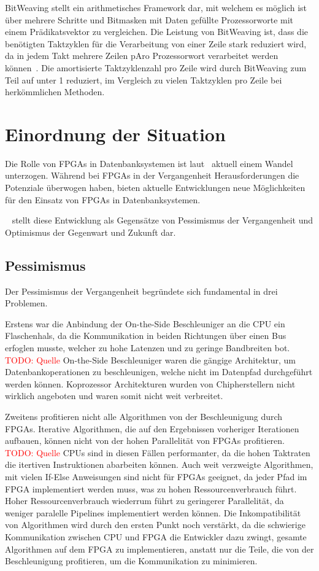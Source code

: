 \documentclass[conference]{IEEEtran}
\newcommand{\todo}[1]{\textcolor{red}{TODO: #1}}
\begin{document}
BitWeaving stellt ein arithmetisches Framework dar, mit welchem es möglich ist über mehrere Schritte und Bitmasken mit Daten gefüllte Prozessorworte mit einem Prädikatsvektor zu vergleichen.
Die Leistung von BitWeaving ist, dass die benötigten Taktzyklen für die Verarbeitung von einer Zeile stark reduziert wird, da in jedem Takt mehrere Zeilen pAro Prozessorwort verarbeitet werden können~\cite{li_bitweaving_2013}.
Die amortisierte Taktzyklenzahl pro Zeile wird durch BitWeaving zum Teil auf unter 1 reduziert, im Vergleich zu vielen Taktzyklen pro Zeile bei herkömmlichen Methoden.



\section{Einordnung der Situation}
Die Rolle von FPGAs in Datenbanksystemen ist laut~\cite{istvan_glass_2019} aktuell einem Wandel unterzogen. Während bei FPGAs in der Vergangenheit
Herausforderungen die Potenziale überwogen haben, bieten aktuelle Entwicklungen neue Möglichkeiten für den Einsatz von FPGAs in Datenbanksystemen.

~\cite{istvan_glass_2019} stellt diese Entwicklung als Gegensätze von Pessimismus der Vergangenheit und Optimismus der Gegenwart und Zukunft dar.

\subsection{Pessimismus}
Der Pessimismus der Vergangenheit begründete sich fundamental in drei Problemen.

Erstens war die Anbindung der On-the-Side Beschleuniger an die CPU ein Flaschenhals, da die Kommunikation in beiden Richtungen über
einen Bus erfoglen musste, welcher zu hohe Latenzen und zu geringe Bandbreiten bot. \todo{Quelle} On-the-Side Beschleuniger waren
die gängige Architektur, um Datenbankoperationen zu beschleunigen, welche nicht im Datenpfad durchgeführt werden können.
Koprozessor Architekturen wurden von Chipherstellern nicht wirklich angeboten und waren somit nicht weit verbreitet.

Zweitens profitieren nicht alle Algorithmen von der Beschleunigung durch FPGAs. Iterative Algorithmen, die auf den Ergebnissen vorheriger
Iterationen aufbauen, können nicht von der hohen Parallelität von FPGAs profitieren. \todo{Quelle} CPUs sind in diesen Fällen performanter,
da die hohen Taktraten die itertiven Instruktionen abarbeiten können. Auch weit verzweigte Algorithmen, mit vielen If-Else Anweisungen
sind nicht für FPGAs geeignet, da jeder Pfad im FPGA implementiert werden muss, was zu hohen Ressourcenverbrauch führt. Hoher Ressourcenverbrauch
wiederrum führt zu geringerer Parallelität, da weniger paralelle Pipelines implementiert werden können. Die Inkompatibilität von Algorithmen
wird durch den ersten Punkt noch verstärkt, da die schwierige Kommunikation zwischen CPU und FPGA die Entwickler dazu zwingt, gesamte Algorithmen
auf dem FPGA zu implementieren, anstatt nur die Teile, die von der Beschleunigung profitieren, um die Kommunikation zu minimieren.
\end{document}
